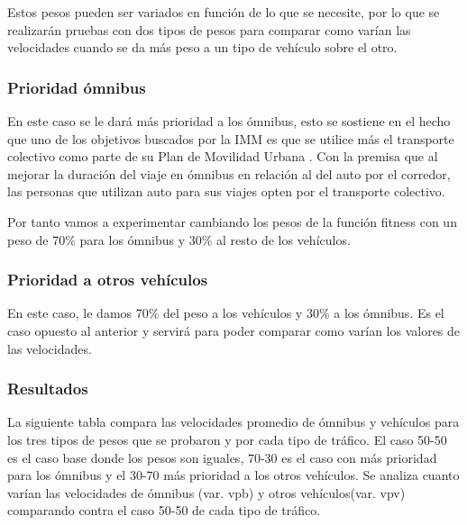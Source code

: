 Estos pesos pueden ser variados en función de lo que se necesite, por lo que se realizarán pruebas con dos tipos de pesos para comparar como varían las velocidades cuando se da más peso a un tipo de vehículo sobre el otro.


\subsubsection{Prioridad ómnibus}
En este caso se le dará más prioridad a los ómnibus, esto se sostiene en el hecho que uno de los objetivos buscados por la IMM  es que se utilice más el transporte colectivo como parte de su Plan de Movilidad Urbana \citep{PlanMovilidad}. Con la premisa que al mejorar la duración del viaje en ómnibus en relación al del auto por el corredor, las personas que utilizan auto para sus viajes opten por el transporte colectivo.

Por tanto vamos a experimentar cambiando los pesos de la función fitness con un peso de 70\% para los ómnibus y 30\% al resto de los vehículos.


\subsubsection{Prioridad a otros vehículos}

En este caso, le damos 70\% del peso a los vehículos y 30\% a los ómnibus. Es el caso opuesto al anterior y servirá para poder comparar como varían los valores de las velocidades.

\subsubsection{Resultados}

La siguiente tabla compara las velocidades promedio de ómnibus y vehículos para los tres tipos de pesos que se probaron y por cada tipo de tráfico.  El caso 50-50 es el caso base donde los pesos son iguales, 70-30 es el caso con más prioridad para los ómnibus y el 30-70 más prioridad a los otros vehículos. Se analiza cuanto varían las velocidades de ómnibus (var. vpb) y otros vehículos(var. vpv) comparando contra el caso 50-50 de cada tipo de tráfico.


